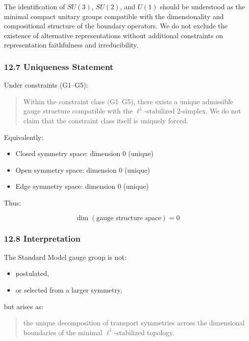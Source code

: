 \documentclass[
]{article}
\providecommand{\tightlist}{%
  \setlength{\itemsep}{0pt}\setlength{\parskip}{0pt}}
\begin{document}
The identification of \(SU(3)\), \(SU(2)\), and \(U(1)\) should be
understood as the minimal compact unitary groups compatible with the
dimensionality and compositional structure of the boundary operators. We
do not exclude the existence of alternative representations without
additional constraints on representation faithfulness and
irreducibility.

\hypertarget{uniqueness-statement-1}{%
\subsubsection{12.7 Uniqueness Statement}\label{uniqueness-statement-1}}

Under constraints (G1--G5):

\begin{quote}
Within the constraint class (G1--G5), there exists a unique admissible
gauge structure compatible with the \(\ell^1\)-stabilized 2-simplex. We
do not claim that the constraint class itself is uniquely forced.
\end{quote}

Equivalently:

\begin{itemize}
\tightlist
\item
  Closed symmetry space: dimension 0 (unique)
\item
  Open symmetry space: dimension 0 (unique)
\item
  Edge symmetry space: dimension 0 (unique)
\end{itemize}

Thus:

\[
\dim(\text{gauge structure space}) = 0
\]

\hypertarget{interpretation-3}{%
\subsubsection{12.8 Interpretation}\label{interpretation-3}}

The Standard Model gauge group is not:

\begin{itemize}
\tightlist
\item
  postulated,
\item
  or selected from a larger symmetry,
\end{itemize}

but arises as:

\begin{quote}
the unique decomposition of transport symmetries across the dimensional
boundaries of the minimal \(\ell^1\)-stabilized topology.
\end{quote}
\end{document}

